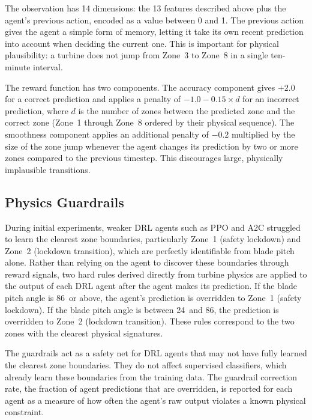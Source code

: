 The observation has 14 dimensions: the 13 features described above plus the agent's
previous action, encoded as a value between 0 and 1. The previous action gives the agent
a simple form of memory, letting it take its own recent prediction into account when
deciding the current one. This is important for physical plausibility: a turbine does not
jump from Zone~3 to Zone~8 in a single ten-minute interval.

The reward function has two components. The accuracy component gives $+2.0$ for a correct
prediction and applies a penalty of $-1.0 - 0.15 \times d$ for an incorrect prediction,
where $d$ is the number of zones between the predicted zone and the correct zone
(Zone~1 through Zone~8 ordered by their physical sequence). The smoothness component
applies an additional penalty of $-0.2$ multiplied by the size of the zone jump whenever
the agent changes its prediction by two or more zones compared to the previous timestep.
This discourages large, physically implausible transitions.

\subsection{Physics Guardrails}
\label{subsec:ch4:guardrails}

During initial experiments, weaker DRL agents such as PPO and A2C struggled to learn
the clearest zone boundaries, particularly Zone~1 (safety lockdown) and Zone~2
(lockdown transition), which are perfectly identifiable from blade pitch alone. Rather
than relying on the agent to discover these boundaries through reward signals, two hard
rules derived directly from turbine physics are applied to the output of each DRL agent
after the agent makes its prediction. If the blade pitch angle is 86\textdegree\ or
above, the agent's prediction is overridden to Zone~1 (safety lockdown). If the blade
pitch angle is between 24\textdegree\ and 86\textdegree, the prediction is overridden to
Zone~2 (lockdown transition). These rules correspond to the two zones with the clearest
physical signatures.

The guardrails act as a safety net for DRL agents that may not have fully learned the
clearest zone boundaries. They do not affect supervised classifiers, which already learn
these boundaries from the training data. The guardrail correction rate, the fraction of
agent predictions that are overridden, is reported for each agent as a measure of how
often the agent's raw output violates a known physical constraint.

